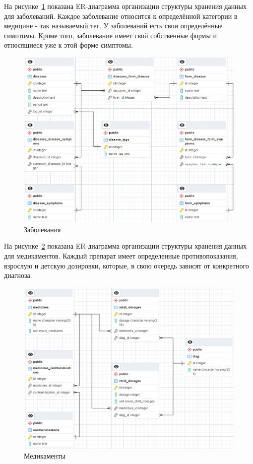 На рисунке~\ref{fig:fig06} показана ER-диаграмма организации структуры хранения данных для заболеваний. Каждое заболевание относится к определённой категории в медицине - так называемый тег. У заболеваний есть свои определённые симптомы. Кроме того, заболевание имеет свой собственные формы и относящиеся уже к этой форме симптомы.

\begin{figure}
  \includegraphics[scale=0.61]{inc/diseases}
  \caption{Заболевания}
  \label{fig:fig06}
\end{figure}

На рисунке~\ref{fig:fig07} показана ER-диаграмма организации структуры хранения данных для медикаментов. Каждый препарат имеет определенные противопоказания, взрослую и детскую дозировки, которые, в свою очередь зависят от конкретного диагноза.

\begin{figure}
  \includegraphics[scale=0.615]{inc/medicines}
  \caption{Медикаменты}
  \label{fig:fig07}
\end{figure}

